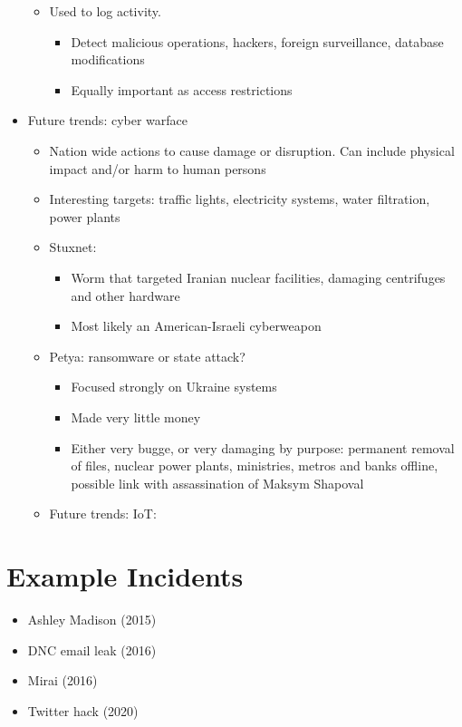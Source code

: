 \documentclass[11pt, faculty=ea]{ugent2016-report}
\begin{document}
\begin{itemize}
\begin{itemize}
                \item Used to log activity.
                    \begin{itemize}
                        \item Detect malicious operations, hackers, foreign surveillance, database modifications
                        \item Equally important as access restrictions
                    \end{itemize}
            \end{itemize}
        \item Future trends: cyber warface
        \begin{itemize}
            \item Nation wide actions to cause damage or disruption. Can include physical impact and/or harm to human persons
            \item Interesting targets: traffic lights, electricity systems, water filtration, power plants
            \item Stuxnet:
                \begin{itemize}
                    \item Worm that targeted Iranian nuclear facilities, damaging centrifuges and other hardware
                    \item Most likely an American-Israeli cyberweapon
                \end{itemize}
            \item Petya: ransomware or state attack?
                \begin{itemize}
                    \item Focused strongly on Ukraine systems
                    \item Made very little money
                    \item Either very bugge, or very damaging by purpose: permanent removal of files, nuclear power plants, ministries, metros and banks offline, possible link with assassination of Maksym Shapoval
                \end{itemize}
            \item Future trends: IoT:  \cite{Ford2013}
        \end{itemize} 
    \end{itemize}

\section{Example Incidents} \label{sec:example-incidents}
    \begin{itemize}
        \item Ashley Madison (2015)
        \item DNC email leak (2016)
        \item Mirai (2016)
        \item Twitter hack (2020)
    \end{itemize}
\end{document}
